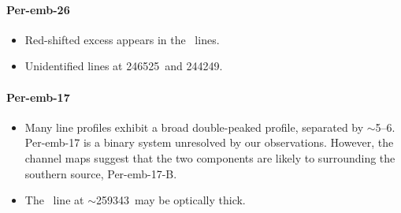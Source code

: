 \paragraph{Per-emb-26}
\begin{itemize}
  \item Red-shifted excess appears in the \methanol\ lines.
  \item Unidentified lines at 246525\mhz\ and 244249\mhz.
\end{itemize}



\paragraph{Per-emb-17}
\begin{itemize}
  \item Many line profiles exhibit a broad double-peaked profile, separated by $\sim$5--6\kms.  Per-emb-17 is a binary system unresolved by our observations.  However, the channel maps suggest that the two components are likely to surrounding the southern source, Per-emb-17-B.
  \item The \methylformate\ line at $\sim$259343\mhz\ may be optically thick.
\end{itemize}

